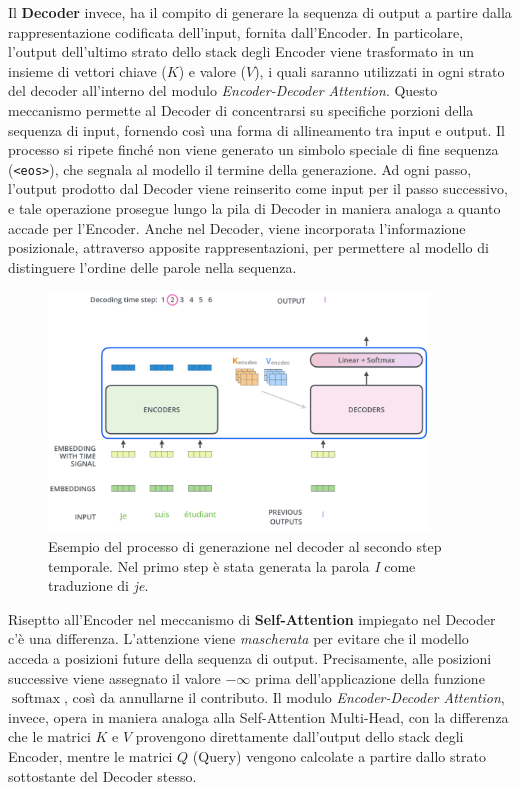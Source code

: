 Il \textbf{Decoder} invece, ha il compito di generare la sequenza di output a partire dalla rappresentazione codificata dell’input, fornita dall’Encoder. In particolare, l’output dell’ultimo strato dello stack degli Encoder viene trasformato in un insieme di vettori chiave ($K$) e valore ($V$), i quali saranno utilizzati in ogni strato del decoder all’interno del modulo \textit{Encoder-Decoder Attention}. Questo meccanismo permette al Decoder di concentrarsi su specifiche porzioni della sequenza di input, fornendo così una forma di allineamento tra input e output. Il processo si ripete finché non viene generato un simbolo speciale di fine sequenza (\texttt{<eos>}), che segnala al modello il termine della generazione. Ad ogni passo, l’output prodotto dal Decoder viene reinserito come input per il passo successivo, e tale operazione prosegue lungo la pila di Decoder in maniera analoga a quanto accade per l’Encoder. Anche nel Decoder, viene incorporata l’informazione posizionale, attraverso apposite rappresentazioni, per permettere al modello di distinguere l’ordine delle parole nella sequenza.
\begin{figure}
    \centering
    \includegraphics[width=0.9\textwidth]{figure/DecoderSample.png}
    \caption{Esempio del processo di generazione nel decoder al secondo step temporale. Nel primo step è stata generata la parola \textit{I} come traduzione di \textit{je}.}
    \label{fig:DecSam}
\end{figure}
Riseptto all’Encoder nel meccanismo di \textbf{Self-Attention} impiegato nel Decoder c'è una differenza. L’attenzione viene \textit{mascherata} per evitare che il modello acceda a posizioni future della sequenza di output. Precisamente, alle posizioni successive viene assegnato il valore $-\infty$ prima dell'applicazione della funzione $\operatorname{softmax}$, così da annullarne il contributo. Il modulo \textit{Encoder-Decoder Attention}, invece, opera in maniera analoga alla Self-Attention Multi-Head, con la differenza che le matrici $K$ e $V$ provengono direttamente dall’output dello stack degli Encoder, mentre le matrici $Q$ (Query) vengono calcolate a partire dallo strato sottostante del Decoder stesso.


